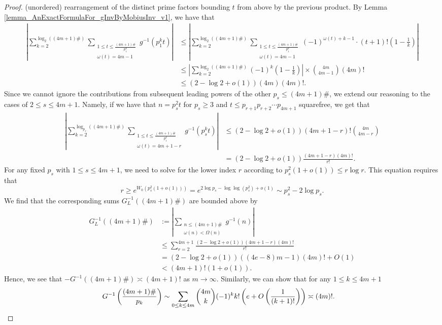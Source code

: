 \documentclass[11pt,reqno,a4letter]{article}
\numberwithin{figure}{section}
\numberwithin{table}{section}
\theoremstyle{plain}
\numberwithin{theorem}{section}
\theoremstyle{definition}
\begin{document}
\begin{proof}
(unordered) rearrangement 
of the distinct prime factors bounding $t$ from above by the previous product. 
By Lemma \ref{lemma_AnExactFormulaFor_gInvByMobiusInv_v1}, we have that 
\begin{align*} 
\left\lvert \sum_{k=2}^{\log_2\left((4m+1)\#\right)} 
     \sum_{\substack{1 \leq t \leq \frac{(4m+1)\#}{p_1^k} \\ \omega(t)=4m-1}} 
     g^{-1}(p_1^k t) \right\rvert & \leq \left\lvert 
     \sum_{k=2}^{\log_2\left((4m+1)\#\right)} 
     \sum_{\substack{1 \leq t \leq \frac{(4m+1)\#}{p_1^k} \\ \omega(t)=4m-1}} 
     (-1)^{\omega(t)+k-1} \cdot (t+1)! \left(1-\frac{1}{k}\right) \right\rvert \\ 
     & \leq \left\lvert \sum_{k=2}^{\log_2\left((4m+1)\#\right)} 
     (-1)^k \left(1-\frac{1}{k}\right) \right\rvert \times \binom{4m}{4m-1} (4m)! \\ 
     & \leq (2-\log 2 + o(1)) (4m) (4m)!. 
\end{align*}
Since we cannot ignore the contributions from subsequent leading powers of the other 
$p_s \leq (4m+1)\#$, 
we extend our reasoning to the cases of $2 \leq s \leq 4m+1$. Namely, if we have that 
$n = p_s^2 t$ for $p_s \geq 3$ and $t \leq p_{r+1} p_{r+2} \cdots p_{4m+1}$ squarefree, 
we get that 
\begin{align*}
\left\lvert \sum_{k=2}^{\log_{p_s}\left((4m+1)\#\right)} 
     \sum_{\substack{1 \leq t \leq \frac{(4m+1)\#}{p_1^k} \\ \omega(t)=4m+1-r}} 
     g^{-1}(p_s^k t) \right\rvert & \leq 
     (2-\log 2 + o(1)) (4m+1-r)! \binom{4m}{4m-r} \\ 
     & = 
     (2-\log 2 + o(1)) \frac{(4m+1-r) (4m)!}{r!}. 
\end{align*}
For any fixed $p_s$ with $1 \leq s \leq 4m+1$, we need to solve for the lower 
index $r$ according to $p_s^2 (1+o(1)) \leq r \log r$. This equation requires that 
\[
r \geq e^{W_0(p_s^2(1+o(1)))} = e^{2\log p_s-\log\log(p_s^2) + o(1)} \sim p_s^2 - 2 \log p_s. 
\]
We find that the corresponding sums $G_L^{-1}((4m+1)\#)$ are bounded above by 
\begin{align*} 
G_L^{-1}((4m+1)\#) & := \left\lvert 
     \sum_{\substack{n \leq (4m+1)\# \\ \omega(n)<\Omega(n)}} g^{-1}(n) 
     \right\rvert \\ 
     & \leq \sum_{r=2}^{4m+1} \frac{(2-\log 2+o(1)) (4m+1-r) (4m)!}{r!} \\ 
     & = (2-\log 2+o(1)) ((4e-8)m-1) (4m)! + O(1) \\ 
     & < (4m+1)! (1+o(1)). 
\end{align*} 
Hence, we see that $-G^{-1}((4m+1)\#) \asymp (4m+1)!$ as $m \rightarrow \infty$. 
Similarly, we can show that for any $1 \leq k \leq 4m+1$ 
\begin{align*}
G^{-1}\left(\frac{(4m+1)\#}{p_k}\right) & \sim \sum_{0 \leq k \leq 4m} \binom{4m}{k} (-1)^{k} k! 
     \left(e + O\left(\frac{1}{(k+1)!}\right)\right) \asymp  (4m)!. 
     \qedhere 
\end{align*}
\end{proof}
\end{document}
